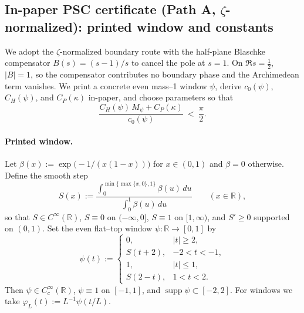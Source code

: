 \documentclass[11pt]{article}
\theoremstyle{definition}
\theoremstyle{remark}
\newcommand{\R}{\mathbb{R}}
\begin{document}
 
\subsection*{In-paper PSC certificate (Path A, \(\zeta\)-normalized): printed window and constants}
We adopt the \(\zeta\)-normalized boundary route with the half-plane Blaschke compensator \(B(s)=(s-1)/s\) to cancel the pole at \(s=1\). On \(\Re s=\tfrac12\), \(|B|=1\), so the compensator contributes no boundary phase and the Archimedean term vanishes. We print a concrete even mass--1 window \(\psi\), derive \(c_0(\psi)\), \(C_H(\psi)\), and \(C_P(\kappa)\) in-paper, and choose parameters so that
\[
  \frac{C_H(\psi)\,M_\psi + C_P(\kappa)}{c_0(\psi)}\ <\ \frac{\pi}{2}.
\]

\paragraph{Printed window.}
Let \(\beta(x):=\exp\!\big(-1/(x(1-x))\big)\) for \(x\in(0,1)\) and \(\beta=0\) otherwise. Define the smooth step
\[
  S(x):=\frac{\int_0^{\min\{\max\{x,0\},1\}} \beta(u)\,du}{\int_0^{1} \beta(u)\,du}\qquad (x\in\R),
\]
so that \(S\in C^\infty(\R)\), \(S\equiv 0\) on \(({-}\infty,0]\), \(S\equiv1\) on \([1,\infty)\), and \(S'\ge 0\) supported on \((0,1)\). Set the even flat--top window \(\psi:\R\to[0,1]\) by
\[
  \psi(t):=\begin{cases}
    0,& |t|\ge 2,\\
    S(t+2),& -2<t<-1,\\
    1,& |t|\le 1,\\
    S(2-t),& 1<t<2.
  \end{cases}
\]
Then \(\psi\in C_c^\infty(\R)\), \(\psi\equiv1\) on \([-1,1]\), and \(\operatorname{supp}\psi\subset[-2,2]\). For windows we take \(\varphi_L(t):=L^{-1}\psi(t/L)\).
\end{document}
